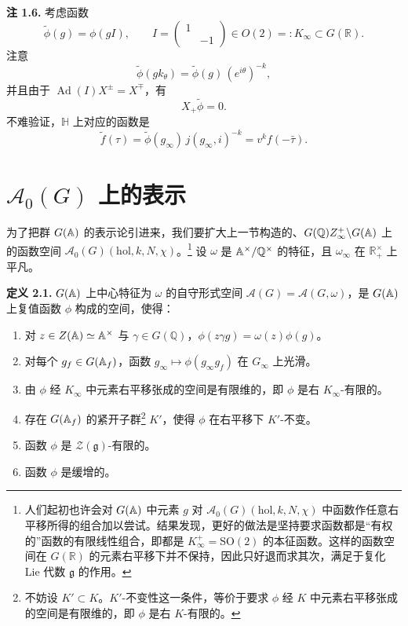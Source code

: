 \medskip\noindent\textbf{注 1.6.}\quad
考虑函数
\begin{equation*}\tag{1.17}
\tilde\phi(g)=\phi(gI),\qquad I=\begin{pmatrix}1&\\&-1\end{pmatrix}\in O(2)=:K_\infty\subset G(\mathbb{R}).
\end{equation*}
注意
\begin{equation*}\tag{1.18}
\tilde\phi(gk_\theta)=\tilde\phi(g)\,(e^{i\theta})^{-k},
\end{equation*}
并且由于 $\operatorname{Ad}(I)X^\pm=X^\mp$，有
\begin{equation*}\tag{1.19}
X_+\tilde\phi=0.
\end{equation*}
不难验证，$\mathbb{H}$ 上对应的函数是
\begin{equation*}\tag{1.20}
\tilde f(\tau)=\tilde\phi(g_\infty)\,j(g_\infty,i)^{-k}=v^k f(-\bar\tau).
\end{equation*}

\section{$\mathcal{A}_0(G)$ 上的表示}

为了把群 $G(\mathbb{A})$ 的表示论引进来，我们要扩大上一节构造的、$G(\mathbb{Q})Z_\infty^+\backslash G(\mathbb{A})$ 上的函数空间 $\mathcal{A}_0(G)(\mathrm{hol},k,N,\chi)$。\footnote{人们起初也许会对 $G(\mathbb{A})$ 中元素 $g$ 对 $\mathcal{A}_0(G)(\mathrm{hol},k,N,\chi)$ 中函数作任意右平移所得的组合加以尝试。结果发现，更好的做法是坚持要求函数都是“有权的”函数的有限线性组合，即都是 $K_\infty^+=\mathrm{SO}(2)$ 的本征函数。这样的函数空间在 $G(\mathbb{R})$ 的元素右平移下并不保持，因此只好退而求其次，满足于复化 Lie 代数 $\mathfrak{g}$ 的作用。} 设 $\omega$ 是 $\mathbb{A}^\times/\mathbb{Q}^\times$ 的特征，且 $\omega_\infty$ 在 $\mathbb{R}^\times_+$ 上平凡。

\medskip\noindent\textbf{定义 2.1.}\quad
$G(\mathbb{A})$ 上中心特征为 $\omega$ 的自守形式空间 $\mathcal{A}(G)=\mathcal{A}(G,\omega)$，是 $G(\mathbb{A})$ 上复值函数 $\phi$ 构成的空间，使得：
\begin{enumerate}[label=(\roman*),leftmargin=2.4em,itemsep=0.15em,topsep=0.25em]
\item 对 $z\in Z(\mathbb{A})\simeq\mathbb{A}^\times$ 与 $\gamma\in G(\mathbb{Q})$，$\phi(z\gamma g)=\omega(z)\phi(g)$。
\item 对每个 $g_f\in G(\mathbb{A}_f)$，函数 $g_\infty\mapsto\phi(g_\infty g_f)$ 在 $G_\infty$ 上光滑。
\item 由 $\phi$ 经 $K_\infty$ 中元素右平移张成的空间是有限维的，即 $\phi$ 是右 $K_\infty$-有限的。
\item 存在 $G(\mathbb{A}_f)$ 的紧开子群\footnote{不妨设 $K'\subset K$。$K'$-不变性这一条件，等价于要求 $\phi$ 经 $K$ 中元素右平移张成的空间是有限维的，即 $\phi$ 是右 $K$-有限的。} $K'$，使得 $\phi$ 在右平移下 $K'$-不变。
\item 函数 $\phi$ 是 $\mathcal{Z}(\mathfrak{g})$-有限的。
\item 函数 $\phi$ 是缓增的。
\end{enumerate}

